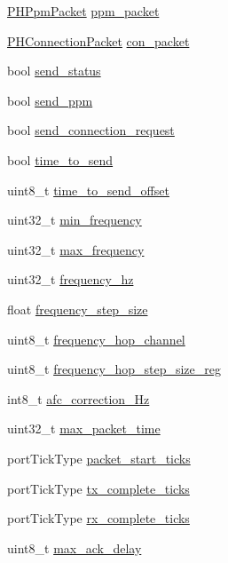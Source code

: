 \begin{DoxyCompactItemize}
\hyperlink{struct_p_h_ppm_packet}{\-P\-H\-Ppm\-Packet} \hyperlink{structpios__rfm22b__dev_abdfbc812f36087f9b8392e9303f28086}{ppm\-\_\-packet}
\item 
\hyperlink{struct_p_h_connection_packet}{\-P\-H\-Connection\-Packet} \hyperlink{structpios__rfm22b__dev_a8bfeaddca61583fad2b2396d61d4c459}{con\-\_\-packet}
\item 
bool \hyperlink{structpios__rfm22b__dev_abf332b1a47bf1d07fbc580382acd4b95}{send\-\_\-status}
\item 
bool \hyperlink{structpios__rfm22b__dev_a44f9d9da0b1740ea9f077873f766ee45}{send\-\_\-ppm}
\item 
bool \hyperlink{structpios__rfm22b__dev_afd7377cf7b2ada828b83887653e4d3c2}{send\-\_\-connection\-\_\-request}
\item 
bool \hyperlink{structpios__rfm22b__dev_a2ab6b40e08577ff473d6a462f6e9ba47}{time\-\_\-to\-\_\-send}
\item 
uint8\-\_\-t \hyperlink{structpios__rfm22b__dev_ad552e65c59e3873f29312042109562cd}{time\-\_\-to\-\_\-send\-\_\-offset}
\item 
uint32\-\_\-t \hyperlink{structpios__rfm22b__dev_acfd89dda5551722d12e887369e3e6616}{min\-\_\-frequency}
\item 
uint32\-\_\-t \hyperlink{structpios__rfm22b__dev_a98085c05f6be6d71a6fbe868ee5f29ef}{max\-\_\-frequency}
\item 
uint32\-\_\-t \hyperlink{structpios__rfm22b__dev_a1b85d9c8c4c8dc7ebb1449ce2febee0e}{frequency\-\_\-hz}
\item 
float \hyperlink{structpios__rfm22b__dev_a8cc9611e61bcaf29852b83cffa87ccd6}{frequency\-\_\-step\-\_\-size}
\item 
uint8\-\_\-t \hyperlink{structpios__rfm22b__dev_a27f8f42b03439de7810e39e4240cc9dc}{frequency\-\_\-hop\-\_\-channel}
\item 
uint8\-\_\-t \hyperlink{structpios__rfm22b__dev_a2ac3d7ab6d15ced50a36ffc03275b5ea}{frequency\-\_\-hop\-\_\-step\-\_\-size\-\_\-reg}
\item 
int8\-\_\-t \hyperlink{structpios__rfm22b__dev_a7ee3ea27898cb9341fcbfe9d4b7ad874}{afc\-\_\-correction\-\_\-\-Hz}
\item 
uint32\-\_\-t \hyperlink{structpios__rfm22b__dev_ab09ddb5c90f5e40bfe8b4be488144ef6}{max\-\_\-packet\-\_\-time}
\item 
port\-Tick\-Type \hyperlink{structpios__rfm22b__dev_add7ce31439ee28ce51c07a4167666141}{packet\-\_\-start\-\_\-ticks}
\item 
port\-Tick\-Type \hyperlink{structpios__rfm22b__dev_af71e33856164ba7654a523173441ecb3}{tx\-\_\-complete\-\_\-ticks}
\item 
port\-Tick\-Type \hyperlink{structpios__rfm22b__dev_a1a3dc2a287da24ec20da3daba8182266}{rx\-\_\-complete\-\_\-ticks}
\item 
uint8\-\_\-t \hyperlink{structpios__rfm22b__dev_ad0342540c88cd117f4c82035cedb1f10}{max\-\_\-ack\-\_\-delay}
\end{DoxyCompactItemize}


